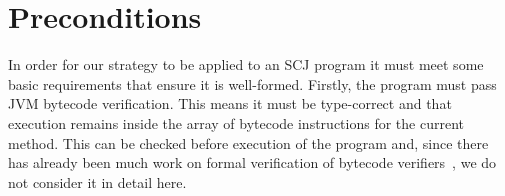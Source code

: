 
\section{Preconditions}
\label{compilation-preconditions-section}

In order for our strategy to be applied to an SCJ program it must meet
some basic requirements that ensure it is well-formed.
Firstly, the program must pass JVM bytecode verification.
This means it must be type-correct and that execution remains inside
the array of bytecode instructions for the current method.
This can be checked before execution of the program and, since there
has already been much work on formal verification of bytecode
verifiers~\cite{coglio2000,klein2003,xavier2003}, we do not
consider it in detail here.

